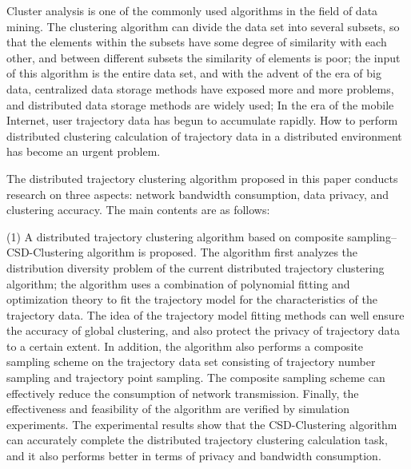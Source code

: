
\begin{englishabstract}
Cluster analysis is one of the commonly used algorithms in the field of data mining. The clustering algorithm can divide the data set into several subsets, so that the elements within the subsets have some degree of similarity with each other, and between different subsets the similarity of elements is poor; the input of this algorithm is the entire data set, and with the advent of the era of big data, centralized data storage methods have exposed more and more problems, and distributed data storage methods are widely used; In the era of the mobile Internet, user trajectory data has begun to accumulate rapidly. How to perform distributed clustering calculation of trajectory data in a distributed environment has become an urgent problem.

The distributed trajectory clustering algorithm proposed in this paper conducts research on three aspects: network bandwidth consumption, data privacy, and clustering accuracy. The main contents are as follows:

(1) A distributed trajectory clustering algorithm based on composite sampling--CSD-Clustering algorithm is proposed. The algorithm first analyzes the distribution diversity problem of the current distributed trajectory clustering algorithm; the algorithm uses a combination of polynomial fitting and optimization theory to fit the trajectory model for the characteristics of the trajectory data. The idea of the trajectory model fitting methods can well ensure the accuracy of global clustering, and also protect the privacy of trajectory data to a certain extent. In addition, the algorithm also performs a composite sampling scheme on the trajectory data set consisting of trajectory number sampling and trajectory point sampling. The composite sampling scheme can effectively reduce the consumption of network transmission. Finally, the effectiveness and feasibility of the algorithm are verified by simulation experiments. The experimental results show that the CSD-Clustering algorithm can accurately complete the distributed trajectory clustering calculation task, and it also performs better in terms of privacy and bandwidth consumption.


\end{englishabstract}
